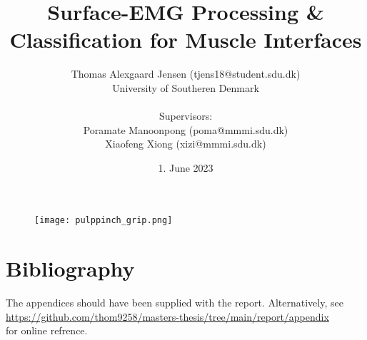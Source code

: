 \documentclass[a4paper, 12pt]{article}
\title{\textbf{Surface-EMG Processing \& Classification for Muscle Interfaces}}
\author{Thomas Alexgaard Jensen (tjens18@student.sdu.dk)
\\University of Southeren Denmark
\\
\\Supervisors: 
\\Poramate Manoonpong (poma@mmmi.sdu.dk)
\\Xiaofeng Xiong (xizi@mmmi.sdu.dk)
}
\date{1. June 2023}
\begin{document}
\thispagestyle{empty}
\maketitle
\thispagestyle{empty}
\begin{figure}[h]
\begin{center}
\texttt{[image: pulppinch\_grip.png]}
\end{center}
\end{figure}


\newpage


\setcounter{page}{1}

\newpage

\newpage

\printglossary
\newpage

\tableofcontents
\newpage


\newpage

\newpage

\newpage

\newpage

\newpage

\newpage

\newpage

\section{Bibliography}
\listoffigures
\listoftables

\printbibliography

\newpage
\listofappendices  %
\appendix %


The appendices should have been supplied with the report.
Alternatively, see \\
\url{https://github.com/thom9258/masters-thesis/tree/main/report/appendix} \\
for online refrence.
\end{document}
